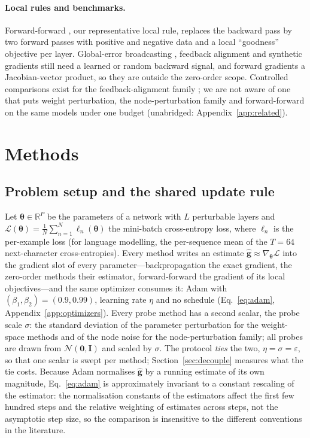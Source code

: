 \documentclass{article}
\newcommand{\ghat}{\hat{\mathbf{g}}}
\newcommand{\btheta}{\boldsymbol{\theta}}
\newcommand{\bI}{\mathbf{I}}
\newcommand{\loss}{\mathcal{L}}
\begin{document}
\paragraph{Local rules and benchmarks.}
Forward-forward \citep{hinton2022}, our representative local rule, replaces the
backward pass by two forward passes with positive and negative data and a local
``goodness'' objective per layer. Global-error broadcasting \citep{clark2021credit},
feedback alignment \citep{lillicrap2016,nokland2016} and synthetic gradients
\citep{jaderberg2017} still need a learned or random backward signal, and forward
gradients \citep{baydin2022,ren2023} a Jacobian-vector product, so they are outside
the zero-order scope. Controlled comparisons exist for the feedback-alignment family
\citep{bartunov2018assessing,launay2020direct,sanfiz2021benchmarking}; we are not
aware of one that puts weight perturbation, the node-perturbation family and
forward-forward on the same models under one budget (unabridged:
Appendix~\ref{app:related}).

\section{Methods}
\label{sec:methods}

\subsection{Problem setup and the shared update rule}
\label{sec:setup-rule}

Let $\btheta\in\mathbb{R}^{P}$ be the parameters of a network with $L$ perturbable
layers and $\loss(\btheta)=\frac{1}{N}\sum_{n=1}^{N}\ell_n(\btheta)$ the mini-batch
cross-entropy loss, where $\ell_n$ is the per-example loss (for language modelling,
the per-sequence mean of the $T=64$ next-character cross-entropies). Every method
writes an estimate $\ghat\approx\nabla_{\btheta}\loss$ into the gradient slot of every
parameter---backpropagation the exact gradient, the zero-order methods their
estimator, forward-forward the gradient of its local objectives---and the same
optimizer consumes it: Adam \citep{kingma2015} with $(\beta_1,\beta_2)=(0.9,0.99)$,
learning rate $\eta$ and no schedule (Eq.~\eqref{eq:adam},
Appendix~\ref{app:optimizers}). Every probe method has a second scalar, the probe
scale $\sigma$: the standard deviation of the parameter perturbation for the
weight-space methods and of the node noise for the node-perturbation family; all
probes are drawn from $\mathcal{N}(\mathbf{0},\bI)$ and scaled by $\sigma$. The
protocol \emph{ties} the two, $\eta=\sigma=\varepsilon$, so that one scalar is swept
per method; Section~\ref{sec:decouple} measures what the tie costs. Because Adam
normalises $\ghat$ by a running estimate of its own magnitude, Eq.~\eqref{eq:adam} is
approximately invariant to a constant rescaling of the estimator: the normalisation
constants of the estimators affect the first few hundred steps and the relative
weighting of estimates across steps, not the asymptotic step size, so the comparison
is insensitive to the different conventions in the literature.
\end{document}
